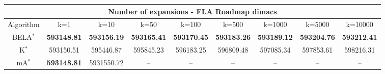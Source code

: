 \begin{tabular}{c|cccccccc}\toprule
\multicolumn{9}{c}{Number of expansions - FLA Roadmap dimacs}\\ \midrule
Algorithm & k=1 & k=10 & k=50 & k=100 & k=500 & k=1000 & k=5000 & k=10000 \\ \midrule
BELA$^*$ & \textbf{593148.81} & \textbf{593156.19} & \textbf{593165.41} & \textbf{593170.45} & \textbf{593183.26} & \textbf{593189.12} & \textbf{593204.76} & \textbf{593212.41} \\
K$^*$ & 593150.51 & 595446.87 & 595845.23 & 596183.25 & 596809.48 & 597085.34 & 597853.61 & 598216.31 \\
mA$^*$ & \textbf{593148.81} & 5931550.72 & -- & -- & -- & -- & -- & -- \\ \bottomrule 
\end{tabular}
